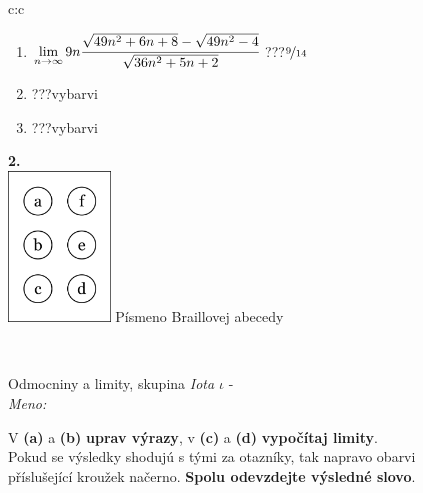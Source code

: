 \documentclass[10pt]{report}
\begin{document}
\begin{tabular}{c:c}
\begin{minipage}[c][104.5mm][t]{0.5\linewidth}
\begin{center}
\begin{minipage}{0.79\linewidth}
\begin{center}
\begin{varwidth}{\linewidth}
\begin{enumerate}
\item $\lim\limits_{n\to\infty}9n\cfrac{\sqrt{49n^2+6n+8}-\sqrt{49n^2-4}}{\sqrt{36n^2+5n+2}}$\quad \dotfill\; ???\;\dotfill \quad $\nicefrac{9}{14}$
\item \quad \dotfill\; ???\;\dotfill \quad vybarvi
\item \quad \dotfill\; ???\;\dotfill \quad vybarvi
\end{enumerate}
\end{varwidth}
\end{center}
\end{minipage}
\begin{minipage}{0.20\linewidth}
\begin{center}
{\Huge\bfseries 2.} \\[2mm]
\includegraphics[height=40mm]{../images/braille.png}
{\small Písmeno Braillovej abecedy}
\end{center}
\end{minipage}
\end{center}
\end{minipage}
\\ \hdashline
\begin{minipage}[c][104.5mm][t]{0.5\linewidth}
\begin{center}
\vspace{7mm}
{\huge Odmocniny a limity, skupina \textit{Iota $\iota$} -}\\[5mm]
\textit{Meno:}\phantom{xxxxxxxxxxxxxxxxxxxxxxxxxxxxxxxxxxxxxxxxxxxxxxxxxxxxxxxxxxxxxxxxx}\\[5mm]
\begin{minipage}{0.95\linewidth}
\begin{center}
V \textbf{(a)} a \textbf{(b)} \textbf{uprav výrazy}, v \textbf{(c)} a \textbf{(d)} \textbf{vypočítaj limity}.\\Pokud se výsledky shodujú s tými za otazníky, tak napravo obarvi\\příslušející kroužek načerno. \textbf{Spolu odevzdejte výsledné slovo}.
\end{center}
\end{minipage}
\\[1mm]

\end{center}
\end{minipage}
\end{tabular}
\end{document}
